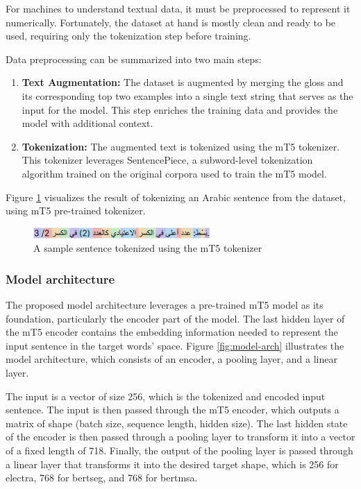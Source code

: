 \documentclass[15pt]{article}
\begin{document}
For machines to understand textual data, it must be preprocessed to represent it numerically. Fortunately, the dataset at hand is mostly clean and ready to be used, requiring only the tokenization step before training.

Data preprocessing can be summarized into two main steps:

\begin{enumerate}
    \item \textbf{Text Augmentation:} The dataset is augmented by merging the gloss and its corresponding top two examples into a single text string that serves as the input for the model. This step enriches the training data and provides the model with additional context.
    \item \textbf{Tokenization:} The augmented text is tokenized using the mT5 tokenizer. This tokenizer leverages SentencePiece, a subword-level tokenization algorithm trained on the original corpora used to train the mT5 model.
\end{enumerate}

Figure \ref{fig:tokenized-sentence} visualizes the result of tokenizing an Arabic sentence from the dataset, using mT5 pre-trained tokenizer.

\begin{figure}[H]
    \centering
    \captionsetup{justification=centering}
    \includegraphics[width=0.6\textwidth]{tokenized-sentence.png}
    \caption{A sample sentence tokenized using the mT5 tokenizer}
    \label{fig:tokenized-sentence}
\end{figure}

\subsubsection{Model architecture}

The proposed model architecture leverages a pre-trained mT5 model as its foundation, particularly the encoder part of the model. The last hidden layer of the mT5 encoder contains the embedding information needed to represent the input sentence in the target words’ space. Figure \ref{fig:model-arch} illustrates the model architecture, which consists of an encoder, a pooling layer, and a linear layer.

The input is a vector of size 256, which is the tokenized and encoded input sentence. The input is then passed through the mT5 encoder, which outputs a matrix of shape (batch size, sequence length, hidden size). The last hidden state of the encoder is then passed through a pooling layer to transform it into a vector of a fixed length of 718. Finally, the output of the pooling layer is passed through a linear layer that transforms it into the desired target shape, which is 256 for electra, 768 for bertseg, and 768 for bertmsa.
\end{document}

